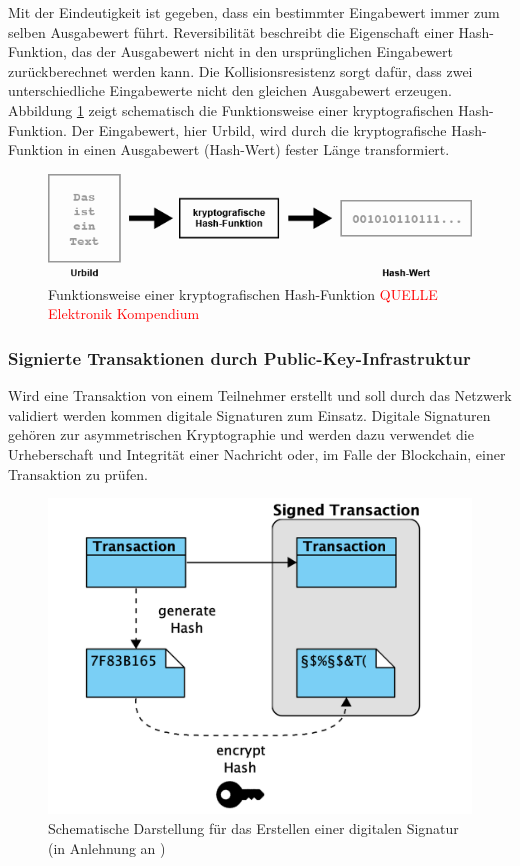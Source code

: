 Mit der Eindeutigkeit ist gegeben, dass ein bestimmter Eingabewert immer zum selben Ausgabewert führt. Reversibilität beschreibt die Eigenschaft einer Hash-Funktion, das der Ausgabewert nicht in den ursprünglichen Eingabewert zurückberechnet werden kann. Die Kollisionsresistenz sorgt dafür, dass zwei unterschiedliche Eingabewerte nicht den gleichen Ausgabewert erzeugen. Abbildung \ref{fig:schema-hash-function} zeigt schematisch die Funktionsweise einer kryptografischen Hash-Funktion. Der Eingabewert, hier Urbild, wird durch die kryptografische Hash-Funktion in einen Ausgabewert (Hash-Wert) fester Länge transformiert.

\begin{figure}[H]
	\centering
	\includegraphics[width=1.0\linewidth]{pictures/schema-hash-function}
	\caption[Funktionsweise einer kryptografischen Hash-Funktion]{Funktionsweise einer kryptografischen Hash-Funktion \textcolor{red}{QUELLE Elektronik Kompendium}}
	\label{fig:schema-hash-function}
\end{figure}

\subsubsection{Signierte Transaktionen durch Public-Key-Infrastruktur}
Wird eine Transaktion von einem Teilnehmer erstellt und soll durch das Netzwerk validiert werden kommen digitale Signaturen zum Einsatz. Digitale Signaturen gehören zur asymmetrischen Kryptographie und werden dazu verwendet die Urheberschaft und Integrität einer Nachricht oder, im Falle der Blockchain, einer Transaktion zu prüfen.\citep{Beutelspacher2010, Menezes1997}

\begin{figure}[H]
	\centering
	\includegraphics[width=0.7\linewidth]{pictures/digital-signatures-create}
	\caption[Erstellen einer digitalen Signatur]{Schematische Darstellung für das Erstellen einer digitalen Signatur (in Anlehnung an \citet{Drescher2017})}
	\label{fig:digital-signatures-create}
\end{figure}

